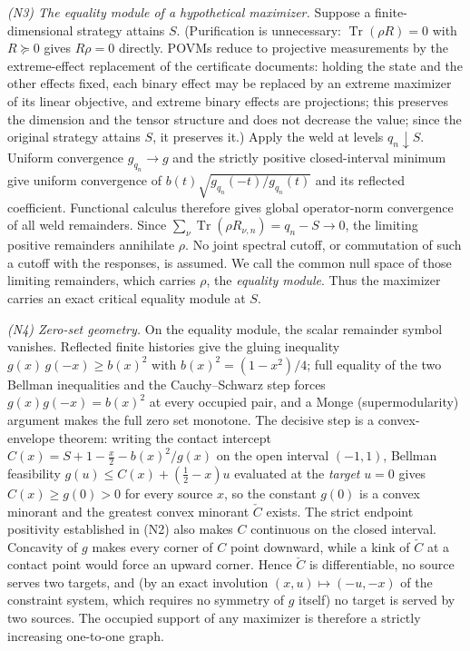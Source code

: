 \documentclass[11pt]{article}
\theoremstyle{remark}
\begin{document}
\emph{(N3) The equality module of a hypothetical maximizer.} Suppose a
finite-dimensional strategy attains $S$. (Purification is unnecessary:
$\operatorname{Tr}(\rho R)=0$ with $R\succeq0$ gives $R\rho=0$ directly.
POVMs reduce to projective measurements by the extreme-effect replacement of
the certificate documents: holding the state and the other effects fixed,
each binary effect may be replaced by an extreme maximizer of its linear
objective, and extreme binary effects are projections; this preserves the
dimension and the tensor structure and does not decrease the value; since
the original strategy attains $S$, it preserves it.) Apply
the weld at levels $q_n\downarrow S$. Uniform convergence $g_{q_n}\to g$
and the strictly positive closed-interval minimum give uniform convergence
of $b(t)\sqrt{g_{q_n}(-t)/g_{q_n}(t)}$ and its reflected coefficient.
Functional calculus therefore gives global operator-norm convergence of
all weld remainders. Since
$\sum_\nu\operatorname{Tr}(\rho R_{\nu,n})=q_n-S\to0$,
the limiting positive remainders annihilate $\rho$. No joint spectral
cutoff, or commutation of such a cutoff with the responses, is assumed.
We call the common null space of those limiting remainders, which
carries $\rho$, the \emph{equality module}. Thus the maximizer carries an
exact critical equality module at $S$.

\emph{(N4) Zero-set geometry.} On the equality module, the scalar remainder
symbol vanishes. Reflected finite histories give the gluing inequality
$g(x)\,g(-x)\ge b(x)^2$ with $b(x)^2=(1-x^2)/4$; full equality of the two
Bellman inequalities and the Cauchy--Schwarz step forces
$g(x)g(-x)=b(x)^2$ at every occupied pair, and a Monge (supermodularity)
argument makes the full zero set monotone. The decisive step is a
convex-envelope theorem: writing the contact intercept
$C(x)=S+1-\tfrac{x}{2}-b(x)^2/g(x)$ on the
open interval $(-1,1)$, Bellman feasibility $g(u)\le C(x)+(\tfrac12-x)u$
evaluated at the \emph{target} $u=0$ gives $C(x)\ge g(0)>0$ for every source
$x$, so the constant $g(0)$ is a convex minorant and the greatest convex
minorant $\check C$ exists. The strict endpoint positivity established in
(N2) also makes $C$ continuous on the closed interval. Concavity of
$g$ makes every corner of $C$ point downward, while a kink of $\check C$ at a
contact point would force an upward corner. Hence $\check C$ is
differentiable, no source serves two
targets, and (by an exact involution $(x,u)\mapsto(-u,-x)$ of the constraint
system, which requires no symmetry of $g$ itself) no target is served by two
sources. The occupied support of any maximizer is therefore a strictly
increasing one-to-one graph.
\end{document}
